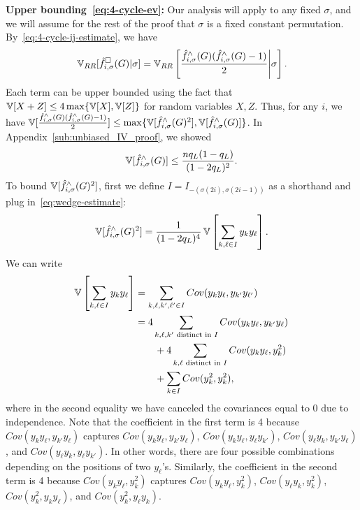 \noindent\textbf{Upper bounding~\eqref{eq:4-cycle-ev}:}
Our analysis will apply to any fixed $\sigma$, and we will assume for the rest
of the proof that $\sigma$ is a fixed constant permutation.
By~\eqref{eq:4-cycle-ij-estimate}, we have
\[\operatorname{\mathbb{V}}_{RR}[\hat{f}_{i,\sigma}^\square(G)|\sigma] =
\operatorname{\mathbb{V}}_{RR}\left[\frac{\hat{f}_{i,\sigma}^\wedge(G)(\hat{f}_{i,\sigma}^\wedge(G)-1)}{2}\middle|\sigma\right].\] Each term
can be upper bounded using the fact that $\operatorname{\mathbb{V}}[X+Z] \leq 4 \max\{\operatorname{\mathbb{V}}[X], \operatorname{\mathbb{V}}[Z]\}$
for random variables $X,Z$.
Thus, for any $i$, we have
$\operatorname{\mathbb{V}}[\frac{\hat{f}_{i,\sigma}^\wedge(G)(\hat{f}_{i,\sigma}^\wedge(G)-1)}{2}]
\leq \max\{\operatorname{\mathbb{V}}[\hat{f}^\wedge_{i,\sigma}(G)^2], \operatorname{\mathbb{V}}[\hat{f}_{i,\sigma}^\wedge(G)]\}$. In
Appendix~\ref{sub:unbiased_IV_proof}, we showed
\begin{equation}\label{eq:4-cycle-l2-varI}
  \operatorname{\mathbb{V}}[\hat{f}^\wedge_{i,\sigma}(G)] \leq \frac{n q_L(1-q_L)}{(1-2q_L)^2}.
\end{equation}
To bound $\operatorname{\mathbb{V}}[\hat{f}^\wedge_{i,\sigma}(G)^2]$, first we define $I = I_{-(\sigma(2i), \sigma(2i-1))}$ as a shorthand and
plug
in~\eqref{eq:wedge-estimate}:
\begin{align*}
    \operatorname{\mathbb{V}}[\hat{f}_{i,\sigma}^\wedge(G)^2] = \frac{1}{(1-2q_L)^4} \operatorname{\mathbb{V}}\left[ \sum_{k,\ell \in I} y_{k} y_{\ell}\right].
\end{align*}
We can write
\begin{align*}
    \operatorname{\mathbb{V}}\left[ \sum_{k,\ell \in I} y_k y_\ell \right] &= \sum_{k,\ell, k', \ell' \in I} Cov(y_k y_\ell, y_{k'} y_{\ell'}) \\
    &= 4 \sum_{k,\ell,k' \text{ distinct in } I} Cov(y_k y_\ell, y_{k'} y_\ell) \\
    &\qquad+ 4 \sum_{k,\ell \text{ distinct in } I} Cov(y_k y_\ell, y_k^2) \\
    &\qquad+ \sum_{k \in I} Cov(y_k^2, y_k^2),
\end{align*}
where in the second equality we have canceled the covariances equal to $0$ due to independence.
Note that the coefficient in the first term is 4 because $Cov(y_k y_\ell, \allowbreak y_{k'} y_\ell)$ captures
$Cov(y_k y_\ell, \allowbreak y_{k'} y_\ell)$, $Cov(y_k y_\ell,\allowbreak  y_\ell y_{k'})$, $Cov(y_\ell y_k, \allowbreak y_{k'} y_\ell)$, and $Cov(y_\ell y_k, \allowbreak y_\ell y_{k'})$.
In other words, there are four possible combinations depending on the positions of two $y_\ell$'s.
Similarly, the coefficient in the second term is 4 because $Cov(y_k y_\ell, \allowbreak y_k^2)$ captures
$Cov(y_k y_\ell, \allowbreak y_k^2)$,
$Cov(y_\ell y_k, \allowbreak y_k^2)$,
$Cov(y_k^2, \allowbreak y_k y_\ell)$, and
$Cov(y_k^2, \allowbreak y_\ell y_k)$.


